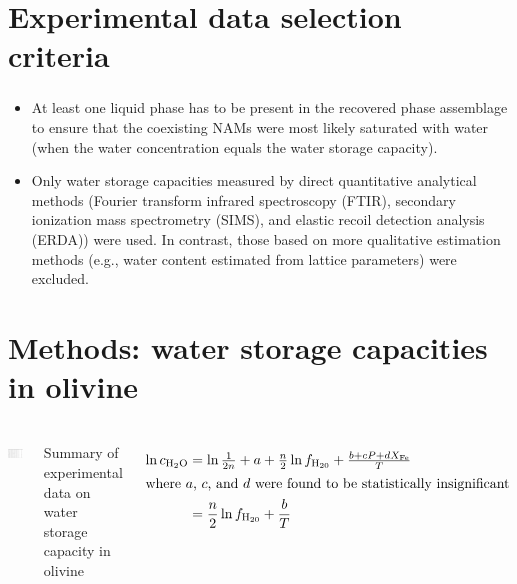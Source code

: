 \documentclass[aspectratio=1610]{beamer}
\begin{document}
\section{Experimental data selection criteria}
\begin{frame}
      \frametitle{\secname}
      \begin{itemize}
            \item At least one liquid phase has to be present in the recovered phase assemblage to
                  ensure that the coexisting NAMs were most likely saturated with water (when the water
                  concentration equals the water storage capacity).
            \item Only water storage capacities measured by direct quantitative analytical methods
                  (Fourier transform infrared spectroscopy (FTIR), secondary ionization mass spectrometry
                  (SIMS), and elastic recoil detection analysis (ERDA)) were used. In contrast, those based on
                  more qualitative estimation methods (e.g., water content estimated from lattice parameters)
                  were excluded.
      \end{itemize}
\end{frame}

\section{Methods: water storage capacities in olivine}
\begin{frame}
      \frametitle{\secname}
      \begin{columns}
            \centering
            \includegraphics[width=\textwidth]{tab1.png}
            \caption{Summary of experimental data on water storage capacity in olivine}
            \small
            \begin{align}
                  \ln c_{\ce{H2O}} & = \ln \tfrac{1}{2 n}+a+\tfrac{n}{2} \ln f_{\ce{H20}}+\tfrac{b+c P+d X_{\ce{Fe}}}{T} \\
                  \intertext{where $a$, $c$, and $d$ were found to be statistically insignificant}
                                   & = \frac{n}{2} \ln f_{\ce{H20}}+\frac{b}{T}
            \end{align}
      \end{columns}
\end{frame}
\end{document}
